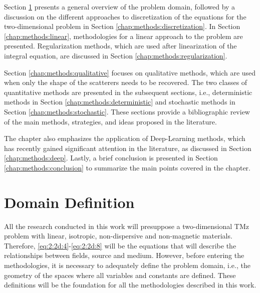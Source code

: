 	Section \ref{chap:methods:definition} presents a general overview of the problem domain, followed by a discussion on the different approaches to discretization of the equations for the two-dimensional problem in Section \ref{chap:methods:discretization}. In Section \ref{chap:methods:linear}, methodologies for a linear approach to the problem are presented. Regularization methods, which are used after linearization of the integral equation, are discussed in Section \ref{chap:methods:regularization}.
	
	Section \ref{chap:methods:qualitative} focuses on qualitative methods, which are used when only the shape of the scatterers needs to be recovered. The two classes of quantitative methods are presented in the subsequent sections, i.e., deterministic methods in Section \ref{chap:methods:deterministic} and stochastic methods in Section \ref{chap:methods:stochastic}. These sections provide a bibliographic review of the main methods, strategies, and ideas proposed in the literature.
	
	The chapter also emphasizes the application of Deep-Learning methods, which has recently gained significant attention in the literature, as discussed in Section \ref{chap:methods:deep}. Lastly, a brief conclusion is presented in Section \ref{chap:methods:conclusion} to summarize the main points covered in the chapter.
	

	\section{Domain Definition}\label{chap:methods:definition}
	
	 	All the research conducted in this work will presuppose a two-dimensional TMz problem with linear, isotropic, non-dispersive and non-magnetic materials. Therefore, \eqref{eq:2:2d:4}-\eqref{eq:2:2d:8} will be the equations that will describe the relationships between fields, source and medium. However, before entering the methodologies, it is necessary to adequately define the problem domain, i.e., the geometry of the spaces where all variables and constants are defined. These definitions will be the foundation for all the methodologies described in this work.
	 	
